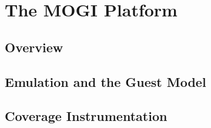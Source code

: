 
\chapter{The MOGI Platform}\label{chap:platform}


\section{Overview}\label{sec:platform-overview}


\section{Emulation and the Guest Model}\label{sec:platform-emulation}


\section{Coverage Instrumentation}\label{sec:platform-coverage}


